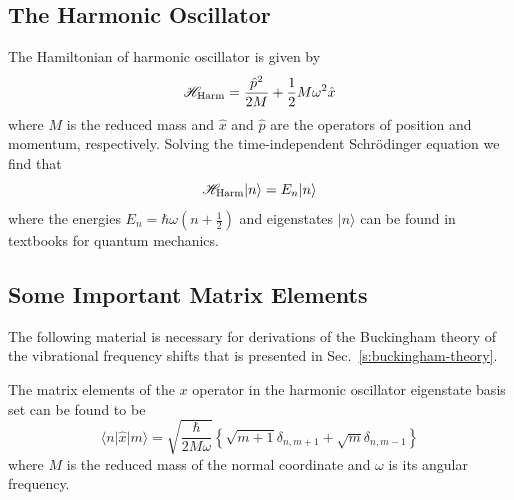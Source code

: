 \documentclass[b5paper,oneside,fleqn,11pt]{book}
\begin{document}
\begin{appendices}
\section{The Harmonic Oscillator\label{a:harmonic-oscillator}}

The Hamiltonian of harmonic oscillator is given by
%
\begin{equation}\label{e:h_harm-appendix}
\mathscr{H}_{\rm Harm} = 
\frac{\hat{p}^2}{2M} + \frac{1}{2} M \omega^2 \hat{x}
\end{equation}
%
where $M$ is the reduced mass and $\hat{x}$ and $\hat{p}$ are the operators
of position and momentum, respectively. Solving the time\hyp{}independent 
Schr{\"o}dinger equation we find that 
%
\begin{equation}\label{e:h_harm-appendix-schreq}
\mathscr{H}_{\rm Harm} \vert n \rangle = 
E_n \vert n \rangle 
\end{equation}
%
where the energies $E_n=\hbar \omega \left( n+\frac{1}{2} \right)$ 
and eigenstates $\vert n \rangle$ can be found
in textbooks for quantum mechanics.

\subsection{Some Important Matrix Elements\label{a:matrix-elements}}

The following material is necessary for derivations of the Buckingham theory
of the vibrational frequency shifts that is presented in Sec.~\ref{s:buckingham-theory}. 

The matrix elements of the $x$ operator in the harmonic oscillator eigenstate basis set
can be found to be
%
\begin{equation}
\label{ea:mxn}
\langle n \vert \hat{x} \vert m \rangle = 
\sqrt{
\frac{\hbar}{2M\omega}
}
\left\{ 
   \sqrt{m+1} \delta_{n,m+1} + \sqrt{m} \delta_{n,m-1}
\right\}
\end{equation}
%
\noindent where $M$ is the reduced mass of the normal coordinate and $\omega$ is its 
angular frequency.


\end{appendices}
\end{document}
